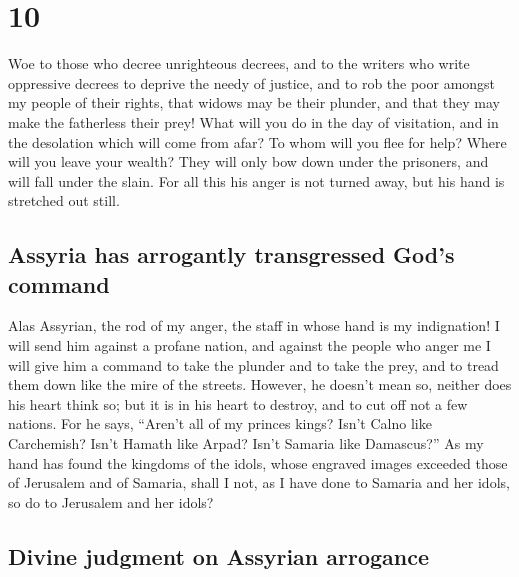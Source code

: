 \hypertarget{section-9}{%
\section{10}\label{section-9}}

 Woe to those who decree unrighteous decrees, and to the
writers who write oppressive decrees  to deprive the needy
of justice, and to rob the poor amongst my people of their rights, that
widows may be their plunder, and that they may make the fatherless their
prey!  What will you do in the day of visitation, and in
the desolation which will come from afar? To whom will you flee for
help? Where will you leave your wealth?  They will only
bow down under the prisoners, and will fall under the slain. For all
this his anger is not turned away, but his hand is stretched out still.

\hypertarget{assyria-has-arrogantly-transgressed-gods-command}{%
\subsection{Assyria has arrogantly transgressed God's
command}\label{assyria-has-arrogantly-transgressed-gods-command}}

 Alas Assyrian, the rod of my anger, the staff in whose
hand is my indignation!  I will send him against a profane
nation, and against the people who anger me I will give him a command to
take the plunder and to take the prey, and to tread them down like the
mire of the streets.  However, he doesn't mean so, neither
does his heart think so; but it is in his heart to destroy, and to cut
off not a few nations.  For he says, ``Aren't all of my
princes kings?  Isn't Calno like Carchemish? Isn't Hamath
like Arpad? Isn't Samaria like Damascus?''  As my hand
has found the kingdoms of the idols, whose engraved images exceeded
those of Jerusalem and of Samaria,  shall I not, as I
have done to Samaria and her idols, so do to Jerusalem and her idols?

\hypertarget{divine-judgment-on-assyrian-arrogance}{%
\subsection{Divine judgment on Assyrian
arrogance}\label{divine-judgment-on-assyrian-arrogance}}

